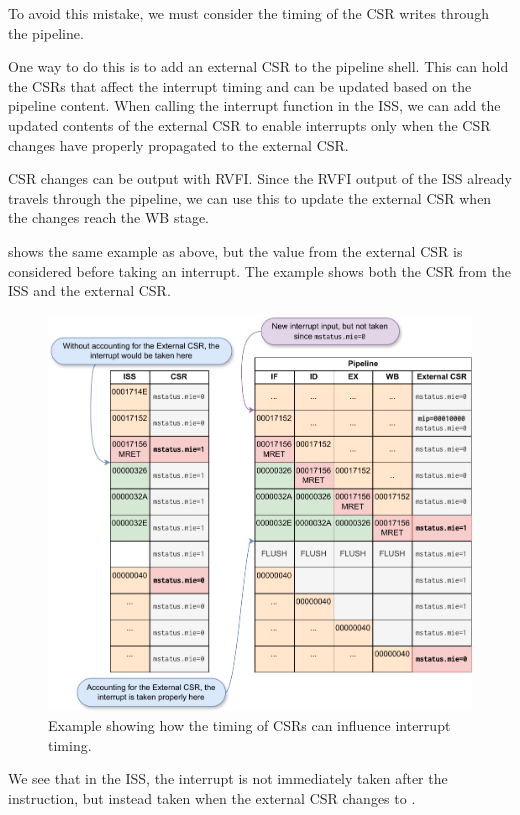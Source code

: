 To avoid this mistake, we must consider the timing of the CSR writes through the pipeline.

One way to do this is to add an external CSR to the pipeline shell. This can hold the CSRs that affect the interrupt timing and can be updated based on the pipeline content. When calling the interrupt function in the ISS, we can add the updated contents of the external CSR to enable interrupts only when the CSR changes have properly propagated to the external CSR.

CSR changes can be output with RVFI. Since the RVFI output of the ISS already travels through the pipeline, we can use this to update the external CSR when the changes reach the WB stage.


 shows the same example as above, but the value from the external CSR is considered before taking an interrupt. The example shows both the CSR from the ISS and the external CSR.

\begin{figure}
    \centering
    \includegraphics[width=1\linewidth]{figures/mret_example.pdf}
    \caption{Example showing how the timing of CSRs can influence interrupt timing.}
    \label{fig:mret_example}
\end{figure}

We see that in the ISS, the interrupt is not immediately taken after the  instruction, but instead taken when the external CSR changes to .

